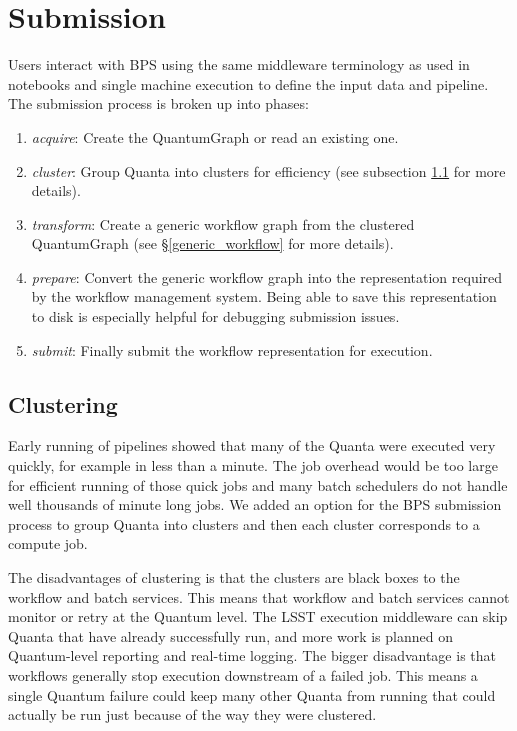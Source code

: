 \documentclass[11pt,twoside]{article}
\begin{document}
\section{Submission}
Users interact with BPS using the same middleware terminology as used
in notebooks and single machine execution to define the input data
and pipeline.  The submission process is broken up into phases:

\begin{enumerate}
\item \textit{acquire}: Create the QuantumGraph or read an existing one.

\item \textit{cluster}: Group Quanta into clusters for efficiency (see
subsection \ref{clustering} for more details).

\item \textit{transform}: Create a generic workflow graph from the
clustered QuantumGraph (see \S\ref{generic_workflow} for more
details).

\item \textit{prepare}: Convert the generic workflow graph into the
representation required by the workflow management system.  Being able
to save this representation to disk is especially helpful for debugging
submission issues.

\item \textit{submit}: Finally submit the workflow representation for
execution.
\end{enumerate}

\subsection{Clustering} \label{clustering}

Early running of pipelines showed that many of the Quanta were
executed very quickly, for example in less than a minute.  The job
overhead would be too large for efficient running of those quick jobs
and many batch schedulers do not handle well thousands of minute long
jobs.  We added an option for the BPS submission process to
group Quanta into clusters and then each cluster corresponds to
a compute job.

The disadvantages of clustering is that the clusters are black
boxes to the workflow and batch services.  This means that workflow
and batch services cannot monitor or retry at the Quantum level.
The LSST execution middleware can skip Quanta that have already
successfully run, and more work is planned on Quantum-level reporting
and real-time logging.  The bigger disadvantage is that workflows
generally stop execution downstream of a failed job.  This means
a single Quantum failure could keep many other Quanta from running
that could actually be run just because of the way they were
clustered.
\end{document}
